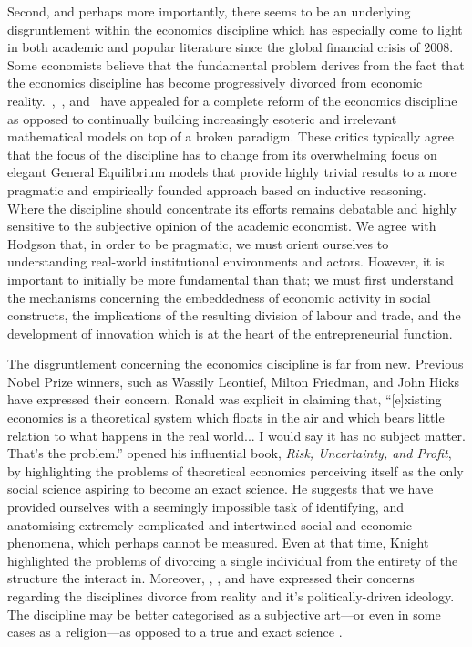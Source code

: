 Second, and perhaps more importantly, there seems to be an underlying disgruntlement within the economics discipline which has especially come to light in both academic and popular literature since the global financial crisis of 2008. Some economists believe that the fundamental problem derives from the fact that the economics discipline has become progressively divorced from economic reality.~\citet{Hodgson2009},~\citet{Smith2010}, and~\citet{Keen2011} have appealed for a complete reform of the economics discipline as opposed to continually building increasingly esoteric and irrelevant mathematical models on top of a broken paradigm. These critics typically agree that the focus of the discipline has to change from its overwhelming focus on elegant General Equilibrium models that provide highly trivial results to a more pragmatic and empirically founded approach based on inductive reasoning. Where the discipline should concentrate its efforts remains debatable and highly sensitive to the subjective opinion of the academic economist. We agree with Hodgson that, in order to be pragmatic, we must orient ourselves to understanding real-world institutional environments and actors. However, it is important to initially be more fundamental than that; we must first understand the mechanisms concerning the embeddedness of economic activity in social constructs, the implications of the resulting division of labour and trade, and the development of innovation which is at the heart of the entrepreneurial function.

The disgruntlement concerning the economics discipline is far from new. Previous Nobel Prize winners, such as Wassily Leontief, Milton Friedman, and John Hicks have expressed their concern. Ronald \citet{Coase1997} was explicit in claiming that, ``[e]xisting economics is a theoretical system which floats in the air and which bears little relation to what happens in the real world... I would say it has no subject matter. That's the problem.'' \citet{Knight1921} opened his influential book, \textit{Risk, Uncertainty, and Profit}, by highlighting the problems of theoretical economics perceiving itself as the only social science aspiring to become an exact science. He suggests that we have provided ourselves with a seemingly impossible task of identifying, and anatomising extremely complicated and intertwined social and economic phenomena, which perhaps cannot be measured. Even at that time, Knight highlighted the problems of divorcing a single individual from the entirety of the structure the interact in. Moreover, \citet{Krugman2009}, \citet{Stiglitz2010}, and \citet{Varoufakis2011} have expressed their concerns regarding the disciplines divorce from reality and it's politically-driven ideology. The discipline may be better categorised as a subjective art---or even in some cases as a religion---as opposed to a true and exact science \citep{Backhouse2010}.

